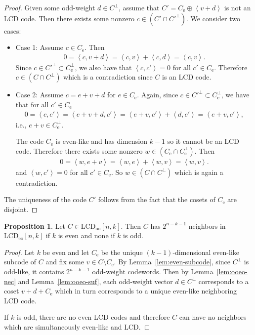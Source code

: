 \documentclass[11pt]{article}
\theoremstyle{definition}
\newtheorem{proposition}[theorem]{Proposition}
\newcommand{\Ang}[1]{\left\langle#1\right\rangle}
\newcommand{\LCDoo}[2]{\mathrm{LCD}_{\mathrm{oo}} [#1, #2]}
\newcommand{\LCDeo}[2]{\mathrm{LCD}_{\mathrm{eo}} [#1, #2]}
\newcommand{\CodeCe}{C_{\mathrm{e}}}
\begin{document}
\begin{proof}
	Given some odd-weight $d \in C^{\perp}$, assume that $C' = \CodeCe \oplus \Ang{v + d}$ is not an LCD code.
	Then there exists some nonzero $c \in (C' \cap C'^{\perp})$.
	We consider two cases:
	\begin{itemize}
		\item Case 1: Assume $c \in \CodeCe$.
			Then
			\begin{align*}
				0
				= \Ang{c, v + d}
				= \Ang{c, v} + \Ang{c, d}
				= \Ang{c, v}.
			\end{align*}
			Since $c \in C'^{\perp} \subset \CodeCe^{\perp}$, we also have that $\Ang{c, c'} = 0$ for all $c' \in \CodeCe$.
			Therefore $c \in (C \cap C^{\perp})$ which is a contradiction since $C$ is an LCD code.
		\item Case 2: Assume $c = e + v + d$ for $e \in \CodeCe$.
			Again, since $c \in C'^{\perp} \subset \CodeCe^{\perp}$, we have that for all $c' \in \CodeCe$
			\begin{align*}
				0
				= \Ang{c, c'}
				= \Ang{e + v + d, c'}
				= \Ang{e + v, c'} + \Ang{d, c'}
				= \Ang{e + v, c'},
			\end{align*}
			i.e., $e + v \in \CodeCe^{\perp}$.

			The code $\CodeCe$ is even-like and has dimension $k - 1$ so it cannot be an LCD code.
			Therefore there exists some nonzero $w \in (\CodeCe \cap \CodeCe^{\perp})$.
			Then
			\begin{align*}
				0
				= \Ang{w, e + v}
				= \Ang{w, e} + \Ang{w, v}
				= \Ang{w, v}.
			\end{align*}
			and $\Ang{w, c'} = 0$ for all $c' \in \CodeCe$.
			So $w \in (C \cap C^{\perp})$ which is again a contradiction.
	\end{itemize}

	The uniqueness of the code $C'$ follows from the fact that the cosets of $\CodeCe$ are disjoint.
\end{proof}

\begin{proposition}\label{prop:ooeo-edges}
	Let $C \in \LCDoo{n}{k}$.
	Then $C$ has $2^{n - k - 1}$ neighbors in $\LCDeo{n}{k}$ if $k$ is even and none if $k$ is odd.
\end{proposition}

\begin{proof}
	Let $k$ be even and let $\CodeCe$ be the unique $(k - 1)$-dimensional even-like subcode of $C$ and fix some $v \in C \setminus \CodeCe$.
	By Lemma~\ref{lem:even-subcode}, since $C^{\perp}$ is odd-like, it contains $2^{n - k - 1}$ odd-weight codewords.
	Then by Lemma~\ref{lem:ooeo-nec} and Lemma~\ref{lem:ooeo-suf}, each odd-weight vector $d \in C^{\perp}$ corresponds to a coset $v + d + \CodeCe$ which in turn corresponds to a unique even-like neighboring LCD code.

	If $k$ is odd, there are no even LCD codes and therefore $C$ can have no neighbors which are simultaneously even-like and LCD\@.
\end{proof}
\end{document}
